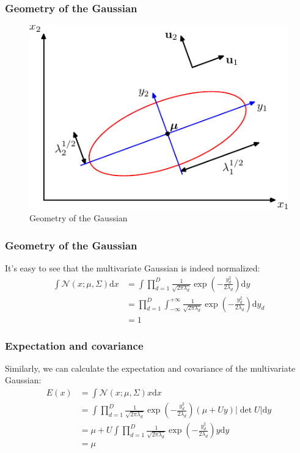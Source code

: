 \documentclass{beamer}
\begin{document}
\begin{frame}
    \frametitle{Geometry of the Gaussian}
    \begin{figure}
        \caption{Geometry of the Gaussian}
        \includegraphics{Figure_3.pdf}
    \end{figure}
\end{frame}

\begin{frame}
    \frametitle{Geometry of the Gaussian}
    It's easy to see that the multivariate Gaussian is indeed normalized:
    \begin{align*}
        \int\mathcal{N}(x;\mu,\Sigma)\mathrm{d}x&=\int\prod_{d=1}^{D}\frac{1}{\sqrt{2\pi\lambda_{d}}}\exp(-\frac{y_{d}^{2}}{2\lambda_{d}})\mathrm{d}y \\
        &=\prod_{d=1}^{D}\int_{-\infty}^{+\infty}\frac{1}{\sqrt{2\pi\lambda_{d}}}\exp(-\frac{y_{d}^{2}}{2\lambda_{d}})\mathrm{d}y_{d} \\
        &=1
    \end{align*}
\end{frame}

\begin{frame}
    \frametitle{Expectation and covariance}
    Similarly, we can calculate the expectation and covariance of the multivariate Gaussian:
    \begin{align*}
        E(x)&=\int\mathcal{N}(x;\mu,\Sigma)x\mathrm{d}x \\
        &=\int\prod_{d=1}^{D}\frac{1}{\sqrt{2\pi\lambda_{d}}}\exp(-\frac{y_{d}^{2}}{2\lambda_{d}})(\mu+Uy)|\det{}U|\mathrm{d}y \\
        &=\mu+U\int\prod_{d=1}^{D}\frac{1}{\sqrt{2\pi\lambda_{d}}}\exp(-\frac{y_{d}^{2}}{2\lambda_{d}})y\mathrm{d}y \\
        &=\mu
    \end{align*}
\end{frame}
\end{document}
